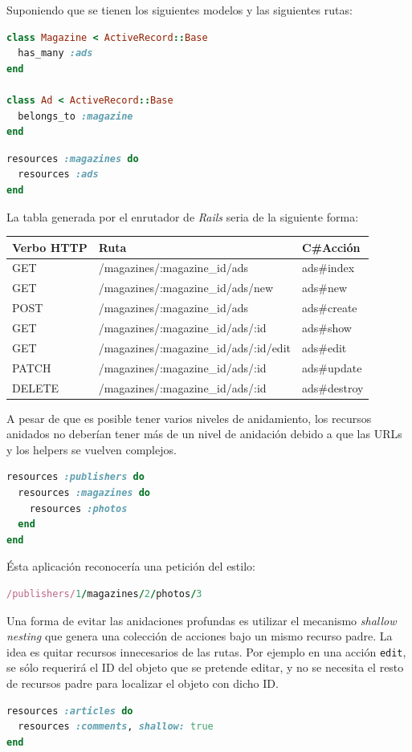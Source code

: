 Suponiendo que se tienen los siguientes modelos y las siguientes rutas:

\begin{lstlisting}[language=Ruby]
class Magazine < ActiveRecord::Base
  has_many :ads
end
 
class Ad < ActiveRecord::Base
  belongs_to :magazine
end
\end{lstlisting}

\begin{lstlisting}[language=Ruby]
resources :magazines do
  resources :ads
end
\end{lstlisting}

La tabla generada por el enrutador de \textit{Rails} seria de la siguiente forma:

\begin{center}
	\scalebox{1} {
	\begin{tabular}{| p{2.5cm} | p{7cm} | p{2.5cm} | }
	\hline
	Verbo HTTP & Ruta & C\#Acción \\ \hline
	GET & /magazines/:magazine\_id/ads & ads\#index \\	
	GET & /magazines/:magazine\_id/ads/new & ads\#new \\
	POST & /magazines/:magazine\_id/ads & ads\#create \\
	GET & /magazines/:magazine\_id/ads/:id & ads\#show \\
	GET & /magazines/:magazine\_id/ads/:id/edit & ads\#edit \\
	PATCH & /magazines/:magazine\_id/ads/:id & ads\#update \\
	DELETE & /magazines/:magazine\_id/ads/:id & ads\#destroy \\  
	\hline
	\end{tabular}
	}
\end{center}


A pesar de que es posible tener varios niveles de anidamiento, los recursos anidados no deberían tener más de un nivel de anidación debido a que las URLs y los helpers se vuelven complejos.

\begin{lstlisting}[language=Ruby]
resources :publishers do
  resources :magazines do
    resources :photos
  end
end
\end{lstlisting}

Ésta aplicación reconocería una petición del estilo:

\begin{lstlisting}[language=Ruby]
/publishers/1/magazines/2/photos/3
\end{lstlisting}

Una forma de evitar las anidaciones profundas es utilizar el mecanismo \textit{shallow nesting} que genera una colección de acciones bajo un mismo recurso padre. La idea es quitar recursos innecesarios de las rutas. Por ejemplo en una acción \texttt{edit}, se sólo requerirá el ID del objeto que se pretende editar, y no se necesita el resto de recursos padre para localizar el objeto con dicho ID.

\begin{lstlisting}[language=Ruby]
resources :articles do
  resources :comments, shallow: true
end
\end{lstlisting}